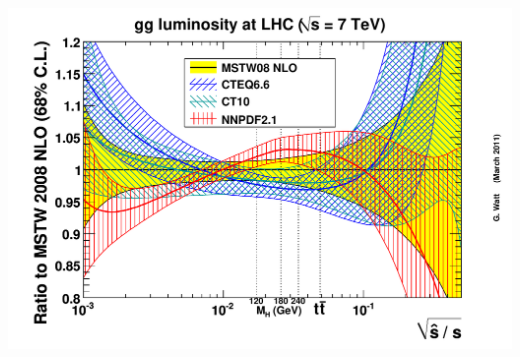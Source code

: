 \documentclass[10pt]{beamer}
\begin{document}
\begin{frame}
\begin{columns}
    \begin{column}{0.55\textwidth}
      \includegraphics[width=1.0\textwidth]{ratiogglumi1_68cl.eps}\\
      \\

  \end{column}  
  \end{columns}

\end{frame}
\end{document}
